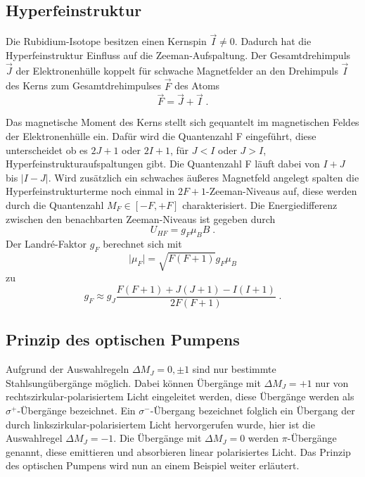 \subsection{Hyperfeinstruktur}
Die Rubidium-Isotope besitzen einen Kernspin $\vec{I} \neq 0$. Dadurch hat die Hyperfeinstruktur
Einfluss auf die Zeeman-Aufspaltung. Der Gesamtdrehimpuls $\vec{J}$ der Elektronenhülle koppelt
für schwache Magnetfelder an den Drehimpuls $\vec{I}$ des Kerns zum Gesamtdrehimpulses $\vec{F}$
des Atoms
\begin{equation}
\vec{F} = \vec{J} + \vec{I} \; .
\label{eq:F}
\end{equation}

Das magnetische Moment des Kerns stellt sich gequantelt im magnetischen Feldes der Elektronenhülle
ein. Dafür wird die Quantenzahl F eingeführt, diese unterscheidet ob es $2J+1$ oder $2I+1$,
für $J<I$ oder $J>I$, Hyperfeinstrukturaufspaltungen gibt. Die Quantenzahl F läuft dabei
von $I+J$ bis $\lvert I-J \rvert$. Wird zusätzlich ein schwaches äußeres Magnetfeld angelegt
spalten die Hyperfeinstrukturterme noch einmal in $2F+1$-Zeeman-Niveaus auf, diese werden durch
die Quantenzahl $M_F \in [-F,+F]$ charakterisiert. Die Energiedifferenz zwischen den benachbarten
Zeeman-Niveaus ist gegeben durch
\begin{equation}
U_{HF} = g_F \mu_B B \; .
\label{eq:UHF}
\end{equation}
Der Landr\'{e}-Faktor $g_F$ berechnet sich mit
\begin{equation}
\lvert \mu_F \rvert = \sqrt{F(F+1)} g_F \mu_B
\label{eq:muF}
\end{equation}
zu
\begin{equation}
g_F \approx g_J \frac{F(F+1) + J(J+1) -I(I+1)}{2F(F+1)} \; .
\label{eq:gF}
\end{equation}

\subsection{Prinzip des optischen Pumpens}
Aufgrund der Auswahlregeln $\Delta M_J = 0, \pm 1$ sind nur bestimmte Stahlsungübergänge möglich.
Dabei können Übergänge mit $\Delta M_J = +1$ nur von rechtszirkular-polarisiertem Licht
eingeleitet werden, diese Übergänge werden als $\sigma^+$-Übergänge bezeichnet. Ein
$\sigma^-$-Übergang bezeichnet folglich ein Übergang der durch linkszirkular-polarisiertem
Licht hervorgerufen wurde, hier ist die Auswahlregel $\Delta M_J = -1$. Die Übergänge mit
$\Delta M_J = 0$ werden $\pi$-Übergänge genannt, diese emittieren und absorbieren
linear polarisiertes Licht. Das Prinzip des optischen Pumpens wird nun an einem
Beispiel weiter erläutert.
